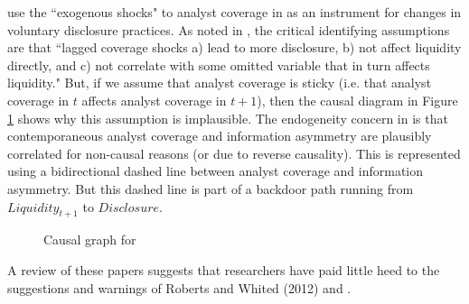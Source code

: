 \citet{Balakrishnan:2014js} use the  ``exogenous shocks" to analyst coverage in \citet{Kelly:2012ih} as an instrument for changes in voluntary disclosure practices. As noted in \citet{Balakrishnan:2014js}, the critical identifying assumptions are that ``lagged coverage shocks a) lead to more disclosure, b) not affect liquidity directly, and c) not correlate with some omitted variable that in turn affects liquidity." But, if we assume that analyst coverage is sticky (i.e. that analyst coverage in $t$ affects analyst coverage in $t+1$), then the causal diagram in Figure \ref{fig:bbkl} shows why this assumption is implausible. 
The endogeneity concern in \citet{Kelly:2012ih}  is that contemporaneous analyst coverage and information asymmetry are plausibly correlated for non-causal reasons (or due to reverse causality). 
This is represented using a bidirectional dashed line between analyst coverage and information asymmetry.
But this dashed line is part of a backdoor path running from $\textit{Liquidity}_{t+1}$ to $\textit{Disclosure}$.

\begin{figure} \caption{Causal graph for \citet{Balakrishnan:2014js}} \label{fig:bbkl}
\end{figure}

A review of these papers suggests that researchers have paid little heed to the suggestions and warnings of Roberts and Whited (2012) and \citet{Larcker:2010fq}. 

